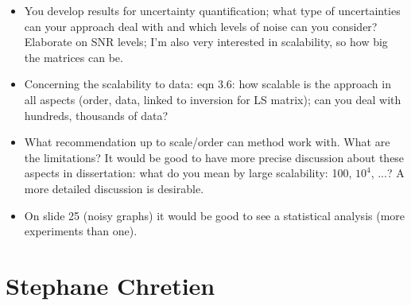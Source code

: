 \documentclass[11pt]{article}
\begin{document}
\begin{itemize}

	\item You develop results for uncertainty quantification; what type of uncertainties  can your approach deal with and which levels of noise can you consider? Elaborate on SNR levels; I’m also very interested in scalability, so how big the matrices can be.
	
	\item  Concerning the scalability to data: eqn 3.6: how scalable is the approach in all aspects (order, data, linked to inversion for LS matrix); can you deal with hundreds, thousands of data?
	
	\item  What recommendation up to scale/order can method work with. What are the limitations? It would be good to have more precise discussion about these aspects in dissertation: what do you mean by large scalability: 100, $10^4$, ...? A more detailed discussion is desirable.
	
	\item  On slide 25 (noisy graphs) it would be good to see a statistical analysis (more experiments than one).
	


\end{itemize}

\section*{Stephane Chretien}
\end{document}
